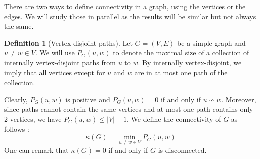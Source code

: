 \documentclass{tufte-handout}
\theoremstyle{definition}
\newtheorem{defn}[thm]{Definition}
\theoremstyle{remark}
\begin{document}
There are two ways to define connectivity in a graph, using the vertices or the edges. We will study those in parallel as the results will be similar but not always the same.

\begin{defn}[Vertex-disjoint paths]
	Let $G=(V,E)$ be a simple graph and $u \neq w \in V$. We will use $P_G(u,w)$ to denote the maximal size of a collection of internally vertex-disjoint paths from $u$ to $w$. By internally vertex-disjoint, we imply that all vertices except for $u$ and $w$ are in at most one path of the collection.
\end{defn}
Clearly, $P_G(u,w)$ is positive and $P_G(u,w) = 0$ if and only if $u \not\sim w$. Moreover, since paths cannot contain the same vertices and at most one path contains only 2 vertices, we have $P_G(u,w) \leq |V|-1$. We define the connectivity of $G$ as follows :
\[ \kappa(G) = \min_{u \neq w \in V}P_G(u,w) \]
One can remark that $\kappa(G) = 0$ if and only if $G$ is disconnected.
\end{document}

